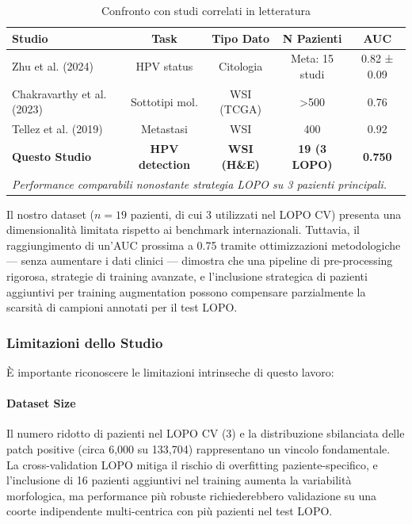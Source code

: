	\begin{table}[h]
		\centering
		\small
		\caption{Confronto con studi correlati in letteratura}
		\label{tab:literature_comparison}
		\begin{tabular}{lcccc}
			\toprule
			\textbf{Studio} & \textbf{Task} & \textbf{Tipo Dato} & \textbf{N Pazienti} & \textbf{AUC} \\
			\midrule
			Zhu et al. (2024) & HPV status & Citologia & Meta: 15 studi & 0.82 ± 0.09 \\
			Chakravarthy et al. (2023) & Sottotipi mol. & WSI (TCGA) & >500 & 0.76 \\
			Tellez et al. (2019) & Metastasi & WSI & 400 & 0.92 \\
			\midrule
			\textbf{Questo Studio} & \textbf{HPV detection} & \textbf{WSI (H\&E)} & \textbf{19 (3 LOPO)} & \textbf{0.750} \\
			\bottomrule
			\multicolumn{5}{l}{\footnotesize \textit{Performance comparabili nonostante strategia LOPO su 3 pazienti principali.}}
		\end{tabular}
	\end{table}
	
	Il nostro dataset ($n=19$ pazienti, di cui 3 utilizzati nel LOPO CV) presenta una dimensionalità limitata rispetto ai benchmark internazionali. Tuttavia, il raggiungimento di un'AUC prossima a 0.75 tramite ottimizzazioni metodologiche — senza aumentare i dati clinici — dimostra che una pipeline di pre-processing rigorosa, strategie di training avanzate, e l'inclusione strategica di pazienti aggiuntivi per training augmentation possono compensare parzialmente la scarsità di campioni annotati per il test LOPO.
	
	\subsubsection{Limitazioni dello Studio}
	
	È importante riconoscere le limitazioni intrinseche di questo lavoro:
	
	\paragraph{Dataset Size} Il numero ridotto di pazienti nel LOPO CV (3) e la distribuzione sbilanciata delle patch positive (circa 6,000 su 133,704) rappresentano un vincolo fondamentale. La cross-validation LOPO mitiga il rischio di overfitting paziente-specifico, e l'inclusione di 16 pazienti aggiuntivi nel training aumenta la variabilità morfologica, ma performance più robuste richiederebbero validazione su una coorte indipendente multi-centrica con più pazienti nel test LOPO.
	
